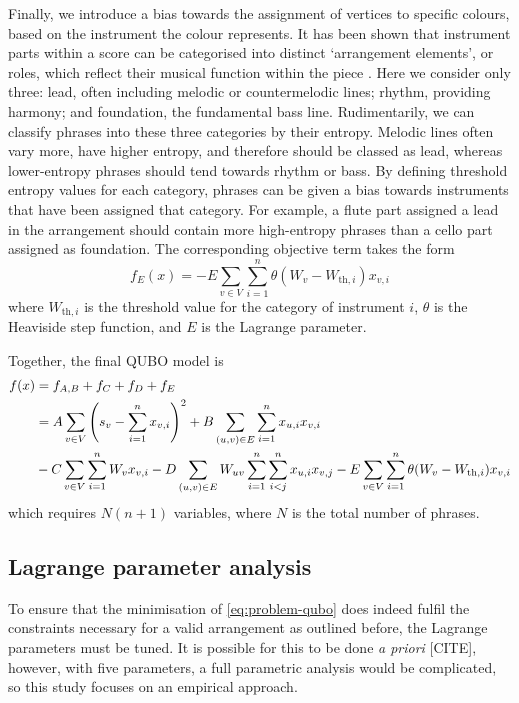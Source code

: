 \documentclass[12pt]{article}
\theoremstyle{definition}
\begin{document}
Finally, we introduce a bias towards the assignment of vertices to specific colours, based on the instrument the colour represents. It has been shown that instrument parts within a score can be categorised into distinct `arrangement elements', or roles, which reflect their musical function within the piece \cite{owsinski_mixing_2017}. Here we consider only three: lead, often including melodic or countermelodic lines; rhythm, providing harmony; and foundation, the fundamental bass line. Rudimentarily, we can classify phrases into these three categories by their entropy. Melodic lines often vary more, have higher entropy, and therefore should be classed as lead, whereas lower-entropy phrases should tend towards rhythm or bass. By defining threshold entropy values for each category, phrases can be given a bias towards instruments that have been assigned that category. For example, a flute part assigned a lead in the arrangement should contain more high-entropy phrases than a cello part assigned as foundation. The corresponding objective term takes the form
\begin{equation}
    f_E(x) = -E\sum_{v\in V}\sum_{i=1}^n \theta(W_v - W_{\text{th},i})x_{v,i}
\end{equation}
where $W_{\text{th},i}$ is the threshold value for the category of instrument $i$, $\theta$ is the Heaviside step function, and $E$ is the Lagrange parameter.

Together, the final QUBO model is
\begin{align}
    f(x)&=f_{A,B}+f_C+f_D+f_E \notag\\
    &=A\sum_{v \in V}\left(s_v-\sum_{i=1}^{n} x_{v,i}\right)^2+B\sum_{(u,v) \in E}\sum_{i=1}^n x_{u,i}x_{v,i} \notag\\
    &-C\sum_{v \in V}\sum_{i=1}^n W_vx_{v,i}-D\sum_{(u,v)\in E}W_{uv}\sum_{i=1}^n\sum_{i<j}^n x_{u,i}x_{v,j}-E\sum_{v \in V}\sum_{i=1}^n\theta(W_v-W_{\text{th},i})x_{v,i}
    \label{eq:problem-qubo}
\end{align}
which requires $N(n+1)$ variables, where $N$ is the total number of phrases.

\subsection{Lagrange parameter analysis}

To ensure that the minimisation of \cref{eq:problem-qubo} does indeed fulfil the constraints necessary for a valid arrangement as outlined before, the Lagrange parameters must be tuned. It is possible for this to be done \textit{a priori} [CITE], however, with five parameters, a full parametric analysis would be complicated, so this study focuses on an empirical approach.
\end{document}
